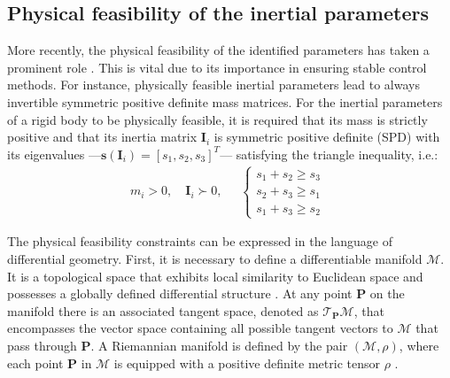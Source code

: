 \subsection{Physical feasibility of the inertial parameters}\label{sec:spd_manifold}
More recently, the physical feasibility of the identified parameters has taken a prominent role \cite{Wensing2017Linearmatrixinequalities,Ayusawa2010Identificationstandardinertial,Traversaro2016Identificationfullyphysical,Sousa2014Physicalfeasibilityrobot}. This is vital due to its importance in ensuring stable control methods. For instance, physically feasible inertial parameters lead to always invertible symmetric positive definite mass matrices. For the inertial parameters of a rigid body to be physically feasible, it is required that its mass is
strictly positive and that its inertia matrix $ \bm{I}_i $ is symmetric positive definite (SPD)  with its eigenvalues ---$\bm{s}\left(\bm{I}_i\right) = [s_1,s_2,s_3]^T$--- satisfying the triangle inequality, i.e.:\\
\begin{equation}\label{eq:feasibility_constraints}
	m_i>0, 
	\quad
	\bm{I}_i \succ 0,
	\quad
	\begin{aligned}
		\begin{cases}
			s_1 + s_2 \geq s_3\\
			s_2 + s_3 \geq s_1\\
			s_1 + s_3 \geq s_2
		\end{cases}
	\end{aligned} 
\end{equation}

The physical feasibility constraints can be expressed in the language of differential geometry. First, it is necessary to define a differentiable manifold $\mathcal{M}$. It is a topological space that exhibits local similarity to Euclidean space and possesses a globally defined differential structure \cite{Jayasumana2013KernelmethodsRiemannian}. At any point $\bm{P}$ on the manifold there is an associated tangent space, denoted as $\mathcal{T}_{\bm{P}}\mathcal{M}$, that encompasses the vector space containing all possible tangent vectors to $\mathcal{M}$ that pass through $\bm{P}$. A Riemannian manifold is defined by the pair $(\mathcal{M},\rho)$, where each point $\bm{P}$ in $\mathcal{M}$ is equipped with a positive definite metric tensor $\rho$ \cite{Pennec2006Riemannianframeworktensor}.

